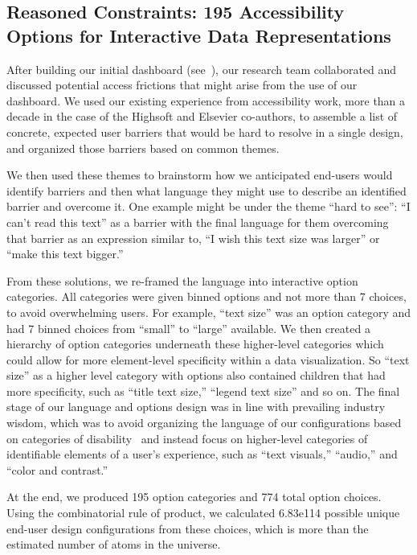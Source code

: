 \documentclass[12pt]{cmuthesis}
\begin{document}
\subsection{Reasoned Constraints: 195 Accessibility Options for Interactive Data Representations}

After building our initial dashboard (see~), our research team collaborated and discussed potential access frictions that might arise from the use of our dashboard. We used our existing experience from accessibility work, more than a decade in the case of the Highsoft and Elsevier co-authors, to assemble a list of concrete, expected user barriers that would be hard to resolve in a single design, and organized those barriers based on common themes.

We then used these themes to brainstorm how we anticipated end-users would identify barriers and then what language they might use to describe an identified barrier and overcome it. One example might be under the theme ``hard to see'': ``I can't read this text'' as a barrier with the final language for them overcoming that barrier as an expression similar to, ``I wish this text size was larger'' or ``make this text bigger.''

From these solutions, we re-framed the language into interactive option categories. All categories were given binned options and not more than 7 choices, to avoid overwhelming users. For example, ``text size'' was an option category and had 7 binned choices from ``small'' to ``large'' available. We then created a hierarchy of option categories underneath these higher-level categories which could allow for more element-level specificity within a data visualization. So ``text size'' as a higher level category with options also contained children that had more specificity, such as ``title text size,'' ``legend text size'' and so on. The final stage of our language and options design was in line with prevailing industry wisdom, which was to avoid organizing the language of our configurations based on categories of disability~\cite{Bailey} and instead focus on higher-level categories of identifiable elements of a user's experience, such as ``text visuals,'' ``audio,'' and ``color and contrast.''

At the end, we produced 195 option categories and 774 total option choices. Using the combinatorial rule of product, we calculated 6.83e114 possible unique end-user design configurations from these choices, which is more than the estimated number of atoms in the universe. 
\end{document}
